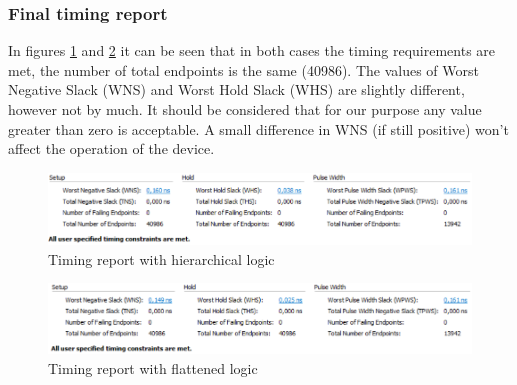 \subsubsection{Final timing report}
\noindent In figures \ref{fig:noflattiming} and \ref{fig:flattiming} it can be seen that in both cases the timing requirements are met, the number of total endpoints is the same (40986). The values of Worst Negative Slack (WNS) and Worst Hold Slack (WHS) are slightly different, however not by much. It should be considered that for our purpose any value greater than zero is acceptable.
A small difference in WNS (if still positive) won't affect the operation of the device.  
\begin{figure}[H]
	\centering
	\includegraphics[width=0.8\linewidth]{IMG/ch4/FirmwareNOFLAT/TIMING}
	\caption{Timing report with hierarchical logic}
	\label{fig:noflattiming}
\end{figure}

\begin{figure}[H]
	\centering
	\includegraphics[width=0.8\linewidth]{IMG/ch4/FirmwareFLAT/TIMING}
	\caption{Timing report with flattened logic}
	\label{fig:flattiming}
\end{figure}

